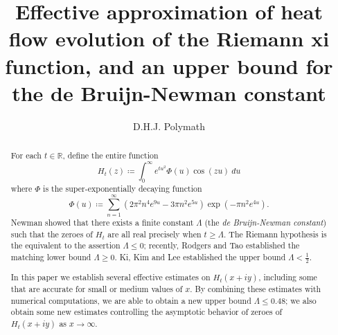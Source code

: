 \documentclass[a4paper,11pt,twoside]{amsart}
\newcommand\R{\mathbb{R}}
\begin{document}
\title[Upper bound for de Bruijn-Newman constant]{Effective approximation of heat flow evolution of the Riemann xi function, and an upper bound for the de Bruijn-Newman constant}

\author{D.H.J. Polymath}
\address{\tt{http://michaelnielsen.org/polymath1/index.php}}


\begin{abstract}
For each $t \in \R$, define the entire function
$$ H_t(z) \coloneqq \int_0^\infty e^{tu^2} \Phi(u) \cos(zu)\ du$$
where $\Phi$ is the super-exponentially decaying function
$$ \Phi(u) \coloneqq \sum_{n=1}^\infty (2\pi^2  n^4 e^{9u} - 3\pi n^2 e^{5u} ) \exp(-\pi n^2 e^{4u} ).$$
Newman showed that there exists a finite constant $\Lambda$ (the \emph{de Bruijn-Newman constant}) such that the zeroes of $H_t$ are all real precisely when $t \geq \Lambda$.  The Riemann hypothesis is the equivalent to the assertion $\Lambda \leq 0$; recently, Rodgers and Tao established the matching lower bound $\Lambda \geq 0$.  Ki, Kim and Lee established the upper bound $\Lambda < \frac{1}{2}$.

In this paper we establish several effective estimates on $H_t(x+iy)$, including some that are accurate for small or medium values of $x$.  By combining these estimates with numerical computations, we are able to obtain a new upper bound $\Lambda \leq 0.48$; we also obtain some new estimates controlling the asymptotic behavior of zeroes of $H_t(x+iy)$ as $x \to \infty$.
\end{abstract}


\maketitle









%
\end{document}
